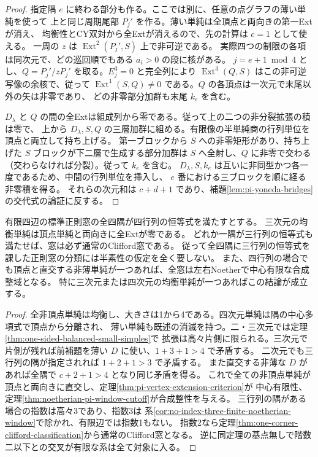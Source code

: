 \begin{proof}
指定隅 $e$ に終わる部分も作る。ここでは別に、任意の点グラフの薄い単純を使って
上と同じ周期尾部 $P_j'$ を作る。薄い単純は全頂点と両向きの第一Extが消え、
均衡性とCY双対から全Extが消えるので、先の計算は $c=1$ として使える。
一周の $z$ は $\operatorname{Ext}^2(P_j',S)$ 上で非可逆である。
実際四つの制限の各項は同次元で、どの巡回順でもある $a_i>0$ の段に核がある。
$j=e+1\bmod4$ とし、$Q=P_j'/zP_j'$ を取る。$E_j^3=0$ と完全列により
$\operatorname{Ext}^3(Q,S)$ はこの非可逆写像の余核で、従って
$\operatorname{Ext}^1(S,Q)\ne0$ である。$Q$ の各頂点は一次元で末尾以外の矢は非零であり、
どの非零部分加群も末尾 $k_e$ を含む。

$D_\lambda$ と $Q$ の間の全Extは組成列から零である。従って上の二つの非分裂拡張の積は零で、
上から $D_\lambda,S,Q$ の三層加群に組める。有限像の半単純商の行列単位を頂点と両立して持ち上げる。
第一ブロックから $S$ への非零矩形があり、持ち上げた $S$ ブロックが下二層で生成する部分加群は
$S$ へ全射し、$Q$ に非零で交わる（交わらなければ分裂）。従って $k_e$ を含む。
$D_\lambda,S,k_e$ は互いに非同型かつ各一度であるため、中間の行列単位を挿入し、
$e$ 番における三ブロックを順に経る非零積を得る。
それらの次元和は $c+d+1$ であり、補題\ref{lem:pi-yoneda-bridges}の交代式の論証に反する。
\end{proof}

\begin{theorem}\label{thm:all-three-matrix-clifford}
有限四辺の標準正則窓の全四隅が四行列の恒等式を満たすとする。
三次元の均衡単純は頂点単純と両向きに全Extが零である。
どれか一隅が三行列の恒等式も満たせば、窓は必ず通常のClifford窓である。
従って全四隅に三行列の恒等式を課した正則窓の分類には半素性の仮定を全く要しない。
また、四行列の場合でも頂点と直交する非薄単純が一つあれば、全窓は左右Noetherで中心有限な合成整域となる。
特に三次元または四次元の均衡単純が一つあればこの結論が成立する。
\end{theorem}
\begin{proof}
全非頂点単純は均衡し、大きさは1から4である。四次元単純は隅の中心多項式で頂点から分離され、
薄い単純も既述の消滅を持つ。二・三次元では定理\ref{thm:one-sided-balanced-small-simples}で
拡張は高々片側に限られる。三次元で片側が残れば前補題を薄い $D$ に使い、$1+3+1>4$ で矛盾する。
二次元でも三行列の隅が指定されれば $1+2+1>3$ で矛盾する。
また直交する非薄な $D$ があれば全隅で $c+2+1>4$ となり同じ矛盾を得る。
これで全ての非頂点単純が頂点と両向きに直交し、定理\ref{thm:pi-vertex-extension-criterion}が
中心有限性、定理\ref{thm:noetherian-pi-window-cutoff}が合成整性を与える。
三行列の隅がある場合の指数は高々3であり、指数3は
系\ref{cor:no-index-three-finite-noetherian-window}で除かれ、有限辺では指数1もない。
指数2なら定理\ref{thm:one-corner-clifford-classification}から通常のClifford窓となる。
逆に同定理の基点無しで階数二以下との交叉が有限な系は全て対象に入る。
\end{proof}
